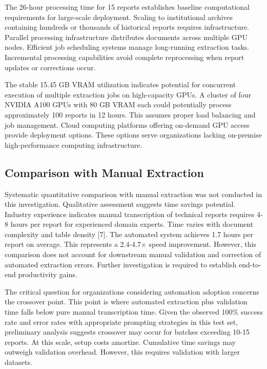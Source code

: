 \documentclass{svproc}
\begin{document}
The 26-hour processing time for 15 reports establishes baseline computational requirements for large-scale deployment. Scaling to institutional archives containing hundreds or thousands of historical reports requires infrastructure. Parallel processing infrastructure distributes documents across multiple GPU nodes. Efficient job scheduling systems manage long-running extraction tasks. Incremental processing capabilities avoid complete reprocessing when report updates or corrections occur.

The stable 15.45 GB VRAM utilization indicates potential for concurrent execution of multiple extraction jobs on high-capacity GPUs. A cluster of four NVIDIA A100 GPUs with 80 GB VRAM each could potentially process approximately 100 reports in 12 hours. This assumes proper load balancing and job management. Cloud computing platforms offering on-demand GPU access provide deployment options. These options serve organizations lacking on-premise high-performance computing infrastructure.

\subsection{Comparison with Manual Extraction}

Systematic quantitative comparison with manual extraction was not conducted in this investigation. Qualitative assessment suggests time savings potential. Industry experience indicates manual transcription of technical reports requires 4-8 hours per report for experienced domain experts. Time varies with document complexity and table density [7]. The automated system achieves 1.7 hours per report on average. This represents a 2.4-4.7× speed improvement. However, this comparison does not account for downstream manual validation and correction of automated extraction errors. Further investigation is required to establish end-to-end productivity gains.

The critical question for organizations considering automation adoption concerns the crossover point. This point is where automated extraction plus validation time falls below pure manual transcription time. Given the observed 100\% success rate and error rates with appropriate prompting strategies in this test set, preliminary analysis suggests crossover may occur for batches exceeding 10-15 reports. At this scale, setup costs amortize. Cumulative time savings may outweigh validation overhead. However, this requires validation with larger datasets.
\end{document}
